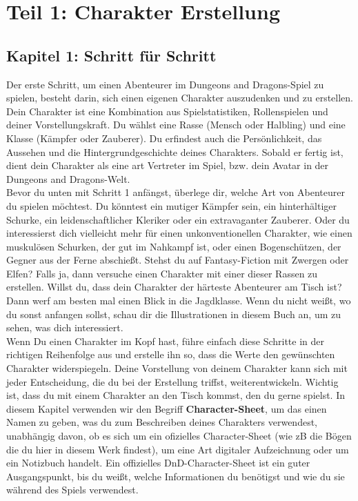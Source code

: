 \chapter{Teil 1: Charakter Erstellung}

\section{Kapitel 1: Schritt für Schritt}
Der erste Schritt, um einen Abenteurer im Dungeons and Dragons-Spiel zu spielen, besteht darin, sich einen eigenen Charakter auszudenken und zu erstellen. Dein Charakter ist eine Kombination aus Spielstatistiken, Rollenspielen und deiner Vorstellungskraft. Du wählst eine Rasse (Mensch oder Halbling) und eine Klasse (Kämpfer oder Zauberer). Du erfindest auch die Persönlichkeit, das Aussehen und die Hintergrundgeschichte deines Charakters. Sobald er fertig ist, dient dein Charakter als eine art Vertreter im Spiel, bzw. dein Avatar in der Dungeons and Dragons-Welt.\\
Bevor du unten mit Schritt 1 anfängst, überlege dir, welche Art von Abenteurer du spielen möchtest. Du könntest ein mutiger Kämpfer sein, ein hinterhältiger Schurke, ein leidenschaftlicher Kleriker oder ein extravaganter Zauberer. Oder du interessierst dich vielleicht mehr für einen unkonventionellen Charakter, wie einen muskulösen Schurken, der gut im Nahkampf ist, oder einen Bogenschützen, der Gegner aus der Ferne abschießt. Stehst du auf Fantasy-Fiction mit Zwergen oder Elfen? Falls ja, dann versuche einen Charakter mit einer dieser Rassen zu erstellen. Willst du, dass dein Charakter der härteste Abenteurer am Tisch ist? Dann werf am besten mal einen Blick in die Jagdklasse. Wenn du nicht weißt, wo du sonst anfangen sollst, schau dir die Illustrationen in diesem Buch an, um zu sehen, was dich interessiert.\\
Wenn Du einen Charakter im Kopf hast, führe einfach diese Schritte in der richtigen Reihenfolge aus und erstelle ihn so, dass die Werte den gewünschten Charakter widerspiegeln. Deine Vorstellung von deinem Charakter kann sich mit jeder Entscheidung, die du bei der Erstellung triffst, weiterentwickeln. Wichtig ist, dass du mit einem Charakter an den Tisch kommst, den du gerne spielst. In diesem Kapitel verwenden wir den Begriff \textbf{Character-Sheet}, um das einen Namen zu geben, was du zum Beschreiben deines Charakters verwendest, unabhängig davon, ob es sich um ein ofizielles Character-Sheet (wie zB die Bögen die du hier in diesem Werk findest), um eine Art digitaler Aufzeichnung oder um ein Notizbuch handelt. Ein offizielles DnD-Character-Sheet ist ein guter Ausgangspunkt, bis du weißt, welche Informationen du benötigst und wie du sie während des Spiels verwendest.
